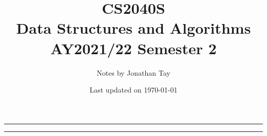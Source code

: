 \documentclass{article}
\title{\vspace{-1cm}\textbf{CS2040S \\[0.25em] Data Structures and Algorithms} \\[2em] \Large AY2021/22 Semester 2 \\[1em]}
\author{Notes by Jonathan Tay}
\date{Last updated on \today}
\newcommand{\pageline}[1]{\par\noindent\rule{\textwidth}{#1}}
\begin{document}
    \maketitle
    \pageline{1.5pt}
    \renewcommand{\baselinestretch}{0.75}\normalsize
    \tableofcontents
    \renewcommand{\baselinestretch}{1.1}\normalsize
    \pageline{1.5pt}

    \newpage
    \begin{multicols*}{2}
        
        
        
        
        
        
        
        
        
        
    \end{multicols*}
\end{document}
